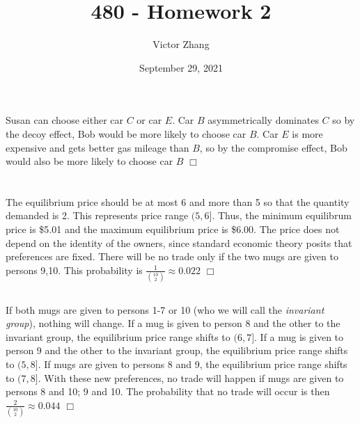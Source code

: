 \documentclass{article}
\title{480 - Homework 2}
\author{Victor Zhang}
\date{September 29, 2021}
\begin{document}
\maketitle

\section{}
Susan can choose either car $C$ or car $E$. Car $B$ asymmetrically dominates $C$ so by the decoy effect, Bob would be more likely to choose car $B$. Car $E$ is more expensive and gets better gas mileage than $B$, so by the compromise effect, Bob would also be more likely to choose car $B$ $\Box$

\section{}
\subsection{}
The equilibrium price should be at most 6 and more than 5 so that the quantity demanded is 2. This represents price range $(5,6]$. Thus, the minimum equilibrum price is \$5.01 and the maximum equilibrium price is \$6.00. The price does not depend on the identity of the owners, since standard economic theory posits that preferences are fixed. There will be no trade only if the two mugs are given to persons 9,10. This probability is $\tfrac{1}{\binom{10}{2}} \approx 0.022$ $\Box$

\subsection{}
If both mugs are given to persons 1-7 or 10 (who we will call the \textit{invariant group}), nothing will change. If a mug is given to person 8 and the other to the invariant group, the equilibrium price range shifts to $(6,7]$. If a mug is given to person 9 and the other to the invariant group, the equilibrium price range shifts to $(5,8]$. If mugs are given to persons 8 and 9, the equilibrium price range shifts to $(7,8]$. With these new preferences, no trade will happen if mugs are given to persons 8 and 10; 9 and 10. The probability that no trade will occur is then $\tfrac{2}{\binom{10}{2}} \approx 0.044$ $\Box$
\end{document}
